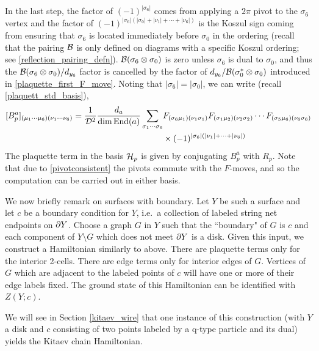 In the last step, the factor of $(-1)^{|\sigma_6|}$ comes from applying a $2\pi$ pivot 
to the $\sigma_6$ vertex and the factor of $(-1)^{|\sigma_6| ( |\sigma_0|+|\nu_1| + \cdots+ |\nu_6|)}$
is the Koszul sign coming from ensuring that $\sigma_6$ is located immediately before $\sigma_0$ in the ordering (recall that the pairing $\mathcal{B}$ is only defined on diagrams with a specific Koszul ordering; see \eqref{reflection_pairing_defn}). 
$\mathcal{B}(\sigma_6 \otimes \sigma_0)$ is zero unless $\sigma_6$ is dual to $\sigma_0$,
and thus the $\mathcal{B}(\sigma_6\otimes \sigma_0)/d_{y_6}$ factor is cancelled by the factor of $d_{y_6}/\mathcal{B}(\sigma_0^*\otimes\sigma_0)$ introduced in \eqref{plaquette_first_F_move}.
Noting that $|\sigma_6| = |\sigma_0|$, we can write (recall \eqref{plaquett_std_basis}),
\begin{align}
\nonumber
[B_p^a]_{(\mu_1 \cdots \mu_6)(\nu_1 \cdots \nu_6)} =  \frac{1}{\mathcal{D}^2} \frac{d_a}{\dim \text{End}(a)} \sum_{\sigma_1 \cdots \sigma_6} &F_{(\sigma_6 \mu_1)( \nu_1\sigma_1)} 
F_{(\sigma_1 \mu_2)( \nu_2 \sigma_2)} \cdots 
F_{(\sigma_5 \mu_6)( \nu_6 \sigma_6)} 
\\
& \times (-1)^{|\sigma_6| (|\nu_1| + \cdots+ |\nu_6|)}
\label{plaquettematrix}
\end{align} 
The plaquette term in the basis $\mathcal{H}_p$ is given by conjugating $B_p^a$ with $R_p$.
Note that due to \eqref{pivotconsistent} the pivots commute with the $F$-moves, 
and so the computation can be carried out in either basis. 


\medskip

We now briefly remark on surfaces with boundary.
Let $Y$ be such a surface and let $c$ be a boundary condition for $Y$, i.e.\ a collection of labeled string net endpoints on $\partial Y$.
Choose a graph $G$ in $Y$ such that the ``boundary" of $G$ is $c$ and each component of $Y\setminus G$ which does not meet $\partial Y$ is a disk.
Given this input, we construct a Hamiltonian similarly to above.
There are plaquette terms only for the interior 2-cells.
There are edge terms only for interior edges of $G$.
Vertices of $G$ which are adjacent to the labeled points of $c$ will have one or more of their edge labels fixed.
The ground state of this Hamiltonian can be identified with $Z(Y;c)$.

We will see in Section \ref{kitaev_wire} that one instance of this construction (with $Y$ a disk and $c$ consisting of two points labeled by a q-type particle
and its dual) yields the Kitaev chain Hamiltonian.


